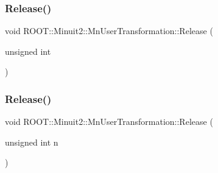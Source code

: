 \subsubsection{\texorpdfstring{Release()}{Release()}\hspace{0.1cm}{\footnotesize\ttfamily [1/4]}}
{\footnotesize\ttfamily void R\+O\+O\+T\+::\+Minuit2\+::\+Mn\+User\+Transformation\+::\+Release (\begin{DoxyParamCaption}\item[{unsigned int}]{ }\end{DoxyParamCaption})}

\mbox{\label{classROOT_1_1Minuit2_1_1MnUserTransformation_acc0c7437f21dc53d1d56d62f7a82d352}} 
\subsubsection{\texorpdfstring{Release()}{Release()}\hspace{0.1cm}{\footnotesize\ttfamily [2/4]}}
{\footnotesize\ttfamily void R\+O\+O\+T\+::\+Minuit2\+::\+Mn\+User\+Transformation\+::\+Release (\begin{DoxyParamCaption}\item[{unsigned int}]{n }\end{DoxyParamCaption})}

